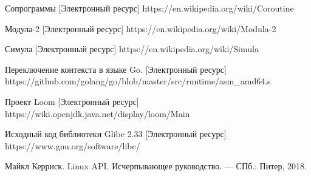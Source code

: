 \begingroup 
\renewcommand{\section}[2]{\anonsection{Библиографический список}}
\begin{thebibliography}{00}

    Сопрограммы
    [Электронный ресурс] 
    https://en.wikipedia.org/wiki/Coroutine

	Модула-2
	[Электронный ресурс] 
	https://en.wikipedia.org/wiki/Modula-2
	
	Симула
	[Электронный ресурс]
	https://en.wikipedia.org/wiki/Simula
	
	
	Переключение контекста в языке Go.
	[Электронный ресурс]
	https://github.com/golang/go/blob/master/src/runtime/asm\_amd64.s
	
	Проект Loom
	[Электронный ресурс]
	https://wiki.openjdk.java.net/display/loom/Main
	
	Исходный код библиотеки Glibc 2.33
	[Электронный ресурс] 
	https://www.gnu.org/software/libc/ %

	Майкл Керриск. Linux API. Исчерпывающее руководство. — СПб.: Питер, 2018.

\end{thebibliography}
\endgroup

\clearpage
